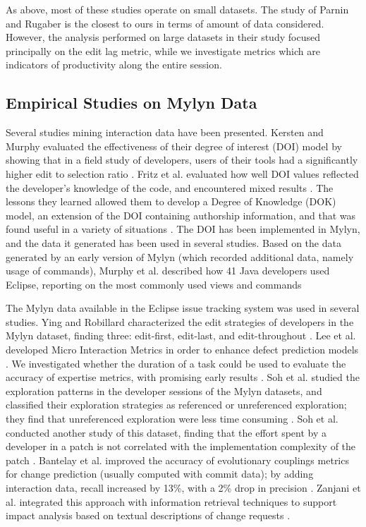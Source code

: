\documentclass[conference]{IEEEtran}
\begin{document}
As above, most of these studies operate on small datasets. The study of Parnin and Rugaber is the closest to ours in terms of amount of data considered. However, the analysis performed on large datasets in their study focused principally on the edit lag metric, while we investigate metrics which are indicators of productivity along the entire session.


\subsection{Empirical Studies on Mylyn Data}

Several studies mining interaction data have been presented. Kersten and Murphy evaluated the effectiveness of their degree of interest (DOI) model by showing that in a field study of developers, users of their tools had a significantly higher edit to selection ratio \cite{KM06}. Fritz et al. evaluated how well DOI values reflected the developer’s knowledge of the code, and encountered mixed results \cite{FMH07}. The lessons they learned allowed them to develop a Degree of Knowledge (DOK) model, an extension of the DOI containing authorship information, and that was found useful in a variety of situations \cite{FOMM10}. The DOI has been implemented in Mylyn, and the data it generated has been used in several studies. Based on the data generated by an early version of Mylyn (which recorded additional data, namely usage of commands), Murphy et al. described how 41 Java developers used Eclipse, reporting on the most commonly used views and commands \cite{MKF06}

The Mylyn data available in the Eclipse issue tracking system was used in several studies. Ying and Robillard characterized the edit strategies of developers in the Mylyn dataset, finding three: edit-first, edit-last, and edit-throughout \cite{YR11}. Lee et al. developed Micro Interaction Metrics in order to enhance defect prediction models \cite{LJD11}. We investigated whether the duration of a task could be used to evaluate the accuracy of expertise metrics, with promising early results \cite{RD13}. Soh et al. studied the exploration patterns in the developer sessions of the Mylyn datasets, and classified their exploration strategies as referenced or unreferenced exploration; they find that unreferenced exploration were less time consuming \cite{SKGAA13}. Soh et al. conducted another study of this dataset, finding that the effort spent by a developer in a patch is not correlated with the implementation complexity of the patch \cite{SKGA13}. Bantelay et al. improved the accuracy of evolutionary couplings metrics for change prediction (usually computed with commit data); by adding interaction data, recall increased by 13\%, with a 2\% drop in precision \cite{BZK13}. Zanjani et al. integrated this approach with information retrieval techniques to support impact analysis based on textual descriptions of change requests \cite{ZSK14}.
\end{document}
